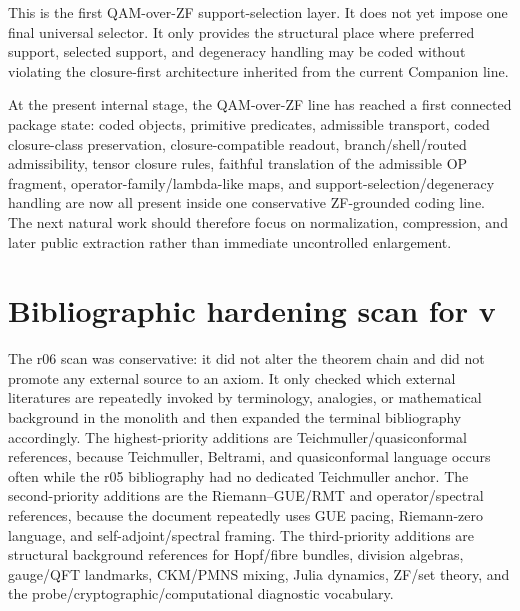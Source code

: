 \begin{remark}
This is the first QAM-over-ZF support-selection layer. It does not yet impose one final universal selector. It only provides the structural place where preferred support, selected support, and degeneracy handling may be coded without violating the closure-first architecture inherited from the current Companion line.
\end{remark}


\begin{remark}
At the present internal stage, the QAM-over-ZF line has reached a first connected package state: coded objects, primitive predicates, admissible transport, coded closure-class preservation, closure-compatible readout, branch/shell/routed admissibility, tensor closure rules, faithful translation of the admissible OP fragment, operator-family/lambda-like maps, and support-selection/degeneracy handling are now all present inside one conservative ZF-grounded coding line. The next natural work should therefore focus on normalization, compression, and later public extraction rather than immediate uncontrolled enlargement.
\end{remark}


\clearpage
\section*{Bibliographic hardening scan for v\docversion}

\noindent The r06 scan was conservative: it did not alter the theorem chain and did not promote any external source to an axiom. It only checked which external literatures are repeatedly invoked by terminology, analogies, or mathematical background in the monolith and then expanded the terminal bibliography accordingly. The highest-priority additions are Teichmuller/quasiconformal references, because Teichmuller, Beltrami, and quasiconformal language occurs often while the r05 bibliography had no dedicated Teichmuller anchor. The second-priority additions are the Riemann--GUE/RMT and operator/spectral references, because the document repeatedly uses GUE pacing, Riemann-zero language, and self-adjoint/spectral framing. The third-priority additions are structural background references for Hopf/fibre bundles, division algebras, gauge/QFT landmarks, CKM/PMNS mixing, Julia dynamics, ZF/set theory, and the probe/cryptographic/computational diagnostic vocabulary.

